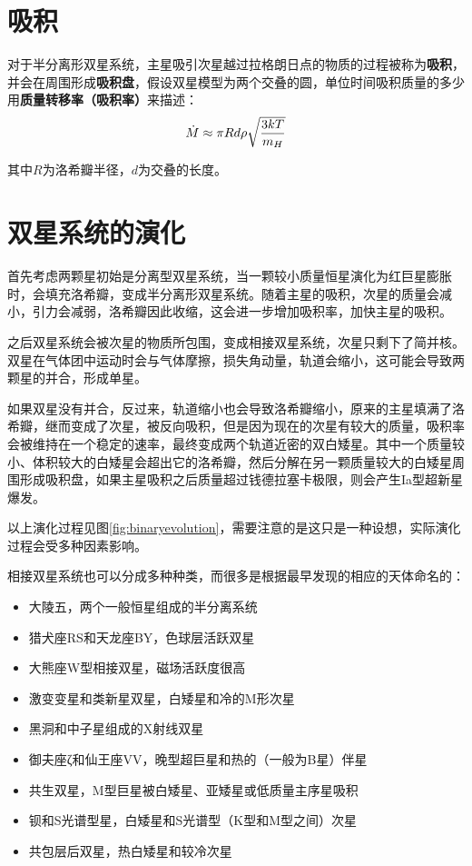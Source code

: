 \section{吸积}
对于半分离形双星系统，主星吸引次星越过拉格朗日点的物质的过程被称为\textbf{吸积}，并会在周围形成\textbf{吸积盘}，假设双星模型为两个交叠的圆，单位时间吸积质量的多少用\textbf{质量转移率（吸积率）}来描述：
\begin{equation}
  \dot M\approx \pi Rd\rho \sqrt{3kT\over m_H}
\end{equation}

其中$R$为洛希瓣半径，$d$为交叠的长度。

\section{双星系统的演化}
首先考虑两颗星初始是分离型双星系统，当一颗较小质量恒星演化为红巨星膨胀时，会填充洛希瓣，变成半分离形双星系统。随着主星的吸积，次星的质量会减小，引力会减弱，洛希瓣因此收缩，这会进一步增加吸积率，加快主星的吸积。

之后双星系统会被次星的物质所包围，变成相接双星系统，次星只剩下了简并核。双星在气体团中运动时会与气体摩擦，损失角动量，轨道会缩小，这可能会导致两颗星的并合，形成单星。

如果双星没有并合，反过来，轨道缩小也会导致洛希瓣缩小，原来的主星填满了洛希瓣，继而变成了次星，被反向吸积，但是因为现在的次星有较大的质量，吸积率会被维持在一个稳定的速率，最终变成两个轨道近密的双白矮星。其中一个质量较小、体积较大的白矮星会超出它的洛希瓣，然后分解在另一颗质量较大的白矮星周围形成吸积盘，如果主星吸积之后质量超过钱德拉塞卡极限，则会产生Ia型超新星爆发。

以上演化过程见图\ref{fig:binaryevolution}，需要注意的是这只是一种设想，实际演化过程会受多种因素影响。

相接双星系统也可以分成多种种类，而很多是根据最早发现的相应的天体命名的：
\begin{itemize}
  \item 大陵五，两个一般恒星组成的半分离系统
  \item 猎犬座RS和天龙座BY，色球层活跃双星
  \item 大熊座W型相接双星，磁场活跃度很高
  \item 激变变星和类新星双星，白矮星和冷的M形次星
  \item 黑洞和中子星组成的X射线双星
  \item 御夫座ζ和仙王座VV，晚型超巨星和热的（一般为B星）伴星
  \item 共生双星，M型巨星被白矮星、亚矮星或低质量主序星吸积
  \item 钡和S光谱型星，白矮星和S光谱型（K型和M型之间）次星
  \item 共包层后双星，热白矮星和较冷次星
\end{itemize}

